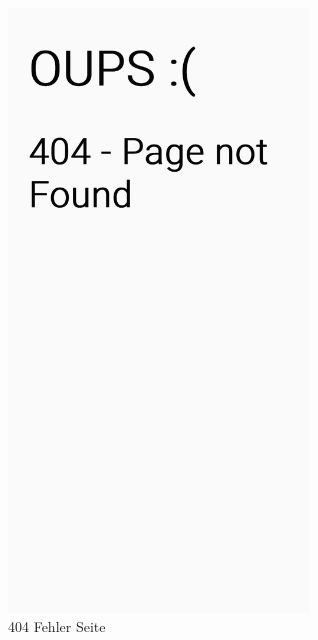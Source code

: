 \begin{figure}[H]
    \centering
    \includegraphics[width=80mm]{media/WebComponents/404.png}
    \caption{404 Fehler Seite}
\end{figure}

